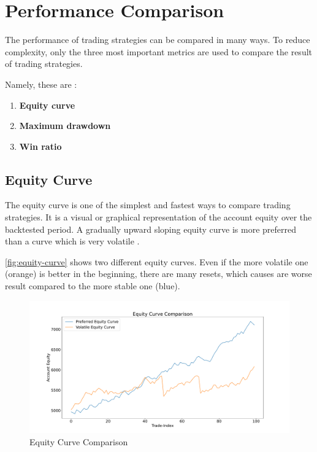 \section{Performance Comparison}
\label{chap:performance}

The performance of trading strategies can be compared in many ways.
To reduce complexity, only the three most important metrics are used to compare the result of trading strategies.

Namely, these are \cite{performace}:

\begin{enumerate}
    \item \textbf{Equity curve}
    \item \textbf{Maximum drawdown}
    \item \textbf{Win ratio}
\end{enumerate}

\subsection{Equity Curve}
\label{chap:equity-curve}

The equity curve is one of the simplest and fastest ways to compare trading strategies.
It is a visual or graphical representation of the account equity over the backtested period.
A gradually upward sloping equity curve is more preferred than a curve which is very volatile \cite{performace}.

\autoref{fig:equity-curve} shows two different equity curves.
Even if the more volatile one (orange) is better in the beginning, there are many resets, which causes are worse result compared to the more stable one (blue).

\begin{figure}[H]
    \centering
    \includegraphics[width=\textwidth]{images/trading-strategies/equity-curve}
    \caption{Equity Curve Comparison}
    \label{fig:equity-curve}
\end{figure}

